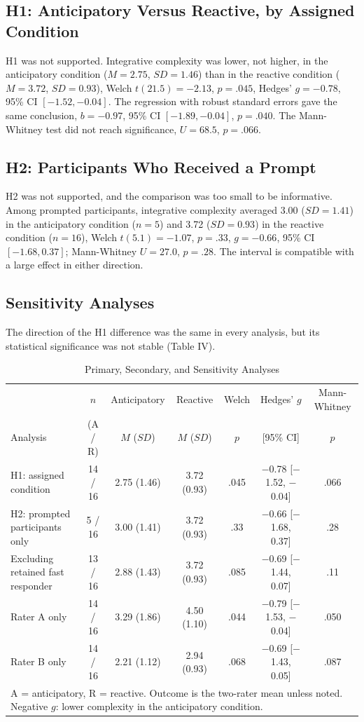 \documentclass[12pt,letterpaper]{article}
\newcommand{\m}{\ensuremath{-}}
\begin{document}
\subsection{H1: Anticipatory Versus Reactive, by Assigned Condition}
H1 was not supported. Integrative complexity was lower, not higher, in the anticipatory condition ($M = 2.75$, $SD = 1.46$) than in the reactive condition ($M = 3.72$, $SD = 0.93$), Welch $t(21.5) = -2.13$, $p = .045$, Hedges' $g = -0.78$, 95\% CI $[-1.52, -0.04]$. The regression with robust standard errors gave the same conclusion, $b = -0.97$, 95\% CI $[-1.89, -0.04]$, $p = .040$. The Mann-Whitney test did not reach significance, $U = 68.5$, $p = .066$.

\subsection{H2: Participants Who Received a Prompt}
H2 was not supported, and the comparison was too small to be informative. Among prompted participants, integrative complexity averaged 3.00 ($SD = 1.41$) in the anticipatory condition ($n = 5$) and 3.72 ($SD = 0.93$) in the reactive condition ($n = 16$), Welch $t(5.1) = -1.07$, $p = .33$, $g = -0.66$, 95\% CI $[-1.68, 0.37]$; Mann-Whitney $U = 27.0$, $p = .28$. The interval is compatible with a large effect in either direction.

\subsection{Sensitivity Analyses}
The direction of the H1 difference was the same in every analysis, but its statistical significance was not stable (Table IV).

\begin{table}[ht]\centering\footnotesize
\caption{Primary, Secondary, and Sensitivity Analyses}
\setlength{\tabcolsep}{4pt}\scriptsize
\begin{tabular}{lcccccc}
\toprule
 & $n$ & Anticipatory & Reactive & Welch & Hedges' $g$ & Mann-Whitney\\
Analysis & (A / R) & $M$ ($SD$) & $M$ ($SD$) & $p$ & [95\% CI] & $p$\\
\midrule
H1: assigned condition & 14 / 16 & 2.75 (1.46) & 3.72 (0.93) & .045 & \m0.78 [\m1.52, \m0.04] & .066\\
H2: prompted participants only & 5 / 16 & 3.00 (1.41) & 3.72 (0.93) & .33 & \m0.66 [\m1.68, 0.37] & .28\\
Excluding retained fast responder & 13 / 16 & 2.88 (1.43) & 3.72 (0.93) & .085 & \m0.69 [\m1.44, 0.07] & .11\\
Rater A only & 14 / 16 & 3.29 (1.86) & 4.50 (1.10) & .044 & \m0.79 [\m1.53, \m0.04] & .050\\
Rater B only & 14 / 16 & 2.21 (1.12) & 2.94 (0.93) & .068 & \m0.69 [\m1.43, 0.05] & .087\\
\bottomrule
\multicolumn{7}{l}{\rule{0pt}{2.4ex}A = anticipatory, R = reactive. Outcome is the two-rater mean unless noted. Negative $g$: lower complexity in the anticipatory condition.}
\end{tabular}
\end{table}
\end{document}
